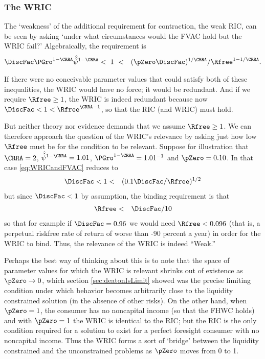 \documentclass[titlepage]{\econtex}\providecommand{\texname}{BufferStockTheory}%
\begin{document}
\subsubsection{The WRIC}

The `weakness' of the additional requirement for contraction, the
weak RIC, can be seen by asking `under what circumstances
would the FVAC hold but the WRIC fail?'
Algebraically, the requirement is
\begin{eqnarray}
 \DiscFac \PGro^{1-\CRRA}\uInvEpShkuInv^{1-\CRRA} & < ~ 1 ~ < & (\pZero \DiscFac)^{1/\CRRA}/\Rfree^{1-1/\CRRA}. \label{eq:WRICandFVAC}
\end{eqnarray}

If there were no conceivable parameter values that could satisfy both
of these inequalities, the WRIC would have no force; it would be
redundant.  And if we require $\Rfree \geq 1$, the WRIC is indeed
redundant because now $\DiscFac <1<\Rfree^{\CRRA-1}$, so that the RIC (and WRIC) must hold.

But neither theory nor evidence demands that we assume $\Rfree \geq
1$.  We can therefore approach the question of the WRIC's relevance by
asking just how low $\Rfree$ must be for the condition to be relevant.
Suppose for illustration that $\CRRA=2$, $\uInvEpShkuInv^{1-\CRRA}=1.01$,
$\PGro^{1-\CRRA}=1.01^{-1}$ and $\pZero = 0.10$.  In that case
\eqref{eq:WRICandFVAC} reduces to
\begin{eqnarray}
  \DiscFac  & < 1 < & (0.1 \DiscFac/\Rfree)^{1/2} \notag
\end{eqnarray}
but since $\DiscFac < 1$ by assumption, the binding requirement is that
\begin{eqnarray}
  \Rfree & < & \DiscFac/10 \notag
\end{eqnarray}
so that for example if $\DiscFac=0.96$ we would need $\Rfree < 0.096$
(that is, a perpetual riskfree rate of return of worse than -90
percent a year) in order for the WRIC to bind.
Thus, the relevance of the WRIC is indeed ``Weak.''

Perhaps the best way of thinking about this is to note that the space
of parameter values for which the WRIC is relevant shrinks out of
existence as $\pZero \rightarrow 0$, which section
\ref{sec:deatonIsLimit} showed was the precise limiting condition
under which behavior becomes arbitrarily close to the liquidity
constrained solution (in the absence of other risks).  On the other
hand, when $\pZero = 1$, the consumer has no noncapital income (so
that the FHWC holds) and with $\pZero=1$ the WRIC is identical to the
RIC; but the RIC is
 the only condition required for a solution to exist
for a perfect foresight consumer with no noncapital income.  Thus the
WRIC forms a sort of `bridge' between the liquidity constrained and
the unconstrained problems as $\pZero$ moves from 0 to 1.
\end{document}
